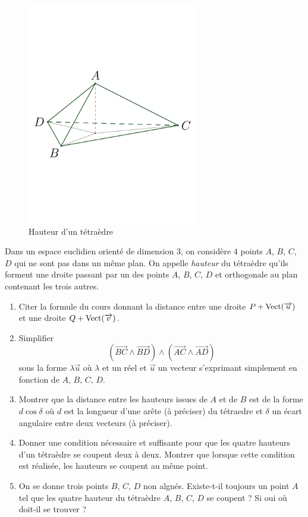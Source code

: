 \begin{figure}[h!t]
 \centering
 \includegraphics[width=7.5cm]{./Edishaut_1.pdf}
 \caption{Hauteur d'un tétraèdre}
 \label{fig:Edishaut_1}
\end{figure}
Dans un espace euclidien orienté de dimension $3$, on considère $4$ points $A$, $B$, $C$, $D$ qui ne sont pas dans un même plan. On appelle \emph{hauteur} du tétraèdre qu'ils forment une droite passant par un des points $A$, $B$, $C$, $D$ et orthogonale au plan contenant les trois autres.
\begin{enumerate}
 \item Citer la formule du cours donnant la distance entre une droite $P +\operatorname{Vect}(\overrightarrow{u})$ et une droite $Q +\operatorname{Vect}(\overrightarrow{v})$.
 \item Simplifier
\begin{displaymath}
 \left(\overrightarrow{BC}\wedge \overrightarrow{BD} \right)
\wedge 
 \left(\overrightarrow{AC}\wedge \overrightarrow{AD} \right)
\end{displaymath}
sous la forme $\lambda \overrightarrow{u}$ où $\lambda$ et un réel et $\overrightarrow{u}$ un vecteur s'exprimant simplement en fonction de $A$, $B$, $C$, $D$.
\item Montrer que la distance entre les hauteurs issues de $A$ et de $B$ est de la forme $d\cos \delta$ où $d$ est la longueur d'une arête (à préciser) du tétraedre et $\delta$ un écart angulaire entre deux vecteurs (à préciser).
\item Donner une condition nécessaire et suffisante pour que les quatre hauteurs d'un tétraèdre se coupent deux à deux. Montrer que lorsque cette condition est réalisée, les hauteurs se coupent au même point.
\item On se donne trois points $B$, $C$, $D$ non algnés. Existe-t-il toujours un point $A$ tel que les quatre hauteur du tétraèdre $A$, $B$, $C$, $D$ se coupent ? Si oui où doit-il se trouver ? 
\end{enumerate}
